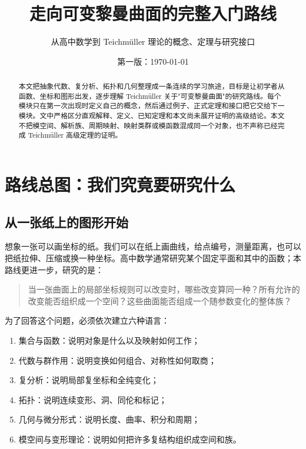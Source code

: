 \documentclass[UTF8,a4paper,11pt]{article}
\title{走向可变黎曼曲面的完整入门路线}
\author{从高中数学到 Teichmüller 理论的概念、定理与研究接口}
\date{第一版：\today}
\theoremstyle{foundation-definition}
\theoremstyle{foundation-theorem}
\theoremstyle{foundation-proposition}
\theoremstyle{foundation-example}
\theoremstyle{foundation-remark}
\theoremstyle{foundation-theorem}
\begin{document}
\maketitle

\begin{abstract}
本文把抽象代数、复分析、拓扑和几何整理成一条连续的学习旅途，目标是让初学者从函数、坐标和图形出发，逐步理解 Teichmüller 关于"可变黎曼曲面"的研究路线。每个模块只在第一次出现时定义自己的概念，然后通过例子、正式定理和接口把它交给下一模块。文中严格区分直观解释、定义、已知定理和本文尚未展开证明的高级结论。本文不把模空间、解析族、周期映射、映射类群或模函数混成同一个对象，也不声称已经完成 Teichmüller 高级定理的证明。
\end{abstract}

\tableofcontents
\clearpage

\section{路线总图：我们究竟要研究什么}

\subsection{从一张纸上的图形开始}

想象一张可以画坐标的纸。我们可以在纸上画曲线，给点编号，测量距离，也可以把纸拉伸、压缩或换一种坐标。高中数学通常研究某个固定平面和其中的函数；本路线更进一步，研究的是：

\begin{quote}
当一张曲面上的局部坐标规则可以改变时，哪些改变算同一种？所有允许的改变能否组织成一个空间？这些曲面能否组成一个随参数变化的整体族？
\end{quote}

为了回答这个问题，必须依次建立六种语言：

\begin{enumerate}[label=(\arabic*)]
  \item 集合与函数：说明对象是什么以及映射如何工作；
  \item 代数与群作用：说明变换如何组合、对称性如何取商；
  \item 复分析：说明局部复坐标和全纯变化；
  \item 拓扑：说明连续变形、洞、同伦和标记；
  \item 几何与微分形式：说明长度、曲率、积分和周期；
  \item 模空间与变形理论：说明如何把许多复结构组织成空间和族。
\end{enumerate}
\end{document}
